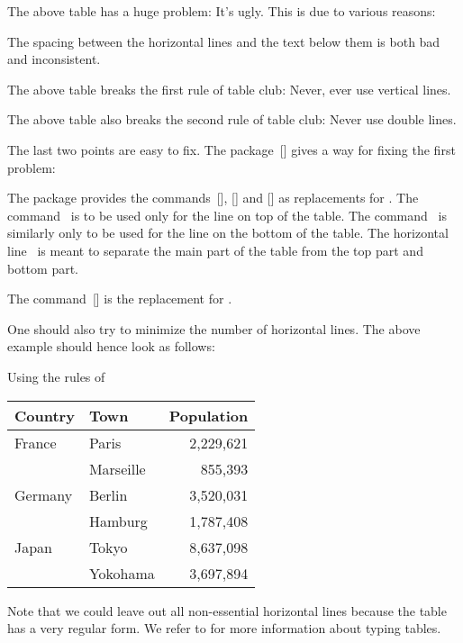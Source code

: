 The above table has a huge problem:
It’s ugly.
This is due to various reasons:
\begin{myitemize}
  \item
    The spacing between the horizontal lines and the text below them is both bad and inconsistent.
  \item
    The above table breaks the first rule of table club:
    Never, ever use vertical lines.
  \item
    The above table also breaks the second rule of table club:
    Never use double lines.
\end{myitemize}
The last two points are easy to fix.
The package~[\packname] gives a way for fixing the first problem:
\begin{myitemize}
  \item
    The package provides the commands~[\comname], [\comname] and [\comname] as replacements for .
    The command~ is to be used only for the line on top of the table.
    The command~ is similarly only to be used for the line on the bottom of the table.
    The horizontal line~ is meant to separate the main part of the table from the top part and bottom part.
  \item
    The command~[\comname] is the replacement for .
\end{myitemize}
One should also try to minimize the number of horizontal lines.
The above example should hence look as follows:
\begin{showlatex}{Using the rules of }
\begin{center}
\begin{tabular}{llr}
  \toprule
  \textbf{Country}  &  \textbf{Town}  & \textbf{Population} \\
  \midrule
  France            & Paris           & 2,229,621           \\
  {}                & Marseille       &   855,393           \\
  Germany           & Berlin          & 3,520,031           \\
  {}                & Hamburg         & 1,787,408           \\
  Japan             & Tokyo           & 8,637,098           \\
  {}                & Yokohama        & 3,697,894           \\
  \bottomrule
\end{tabular}
\end{center}
\end{showlatex}

Note that we could leave out all non-essential horizontal lines because the table has a very regular form.
We refer to \cite{booktab} for more information about typing tables.




